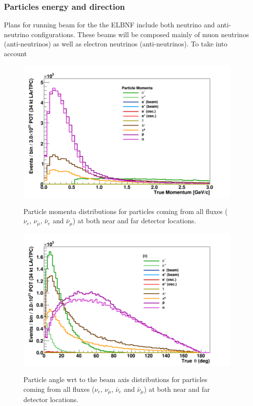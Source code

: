 \newpage

\subsubsection{Particles energy and direction}
Plans for running beam for the the ELBNF include both neutrino and anti-neutrino configurations. These beams will be composed  mainly of muon neutrinos (anti-neutrinos) as well as electron neutrinos (anti-neutrinos). To take into account  

\begin{figure}[h!]
  \centering
\includegraphics[scale=0.4]{figures/True_Momenta_per_Particle}
\label{fig:particle_momenta}
  \caption{Particle momenta distributions for particles coming from all fluxes ($\nu_e$, $\nu_\mu$, $\bar \nu_e$ and $\bar \nu_\mu$) at both near and far detector locations.  }
\end{figure}


\begin{figure}[h!]
  \centering
\includegraphics[scale=0.4]{figures/True_Theta_per_Particle}
\label{fig:particle_momenta}
  \caption{Particle angle wrt to the beam axis distributions for particles coming from all fluxes ($\nu_e$, $\nu_\mu$, $\bar \nu_e$ and $\bar \nu_\mu$) at both near and far detector locations.  }
\end{figure}


